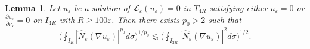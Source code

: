 \documentclass[reqno,12pt]{amsart} %
\newtheorem{lemma}[theorem]{Lemma}
\theoremstyle{definition}
\theoremstyle{remark}
\numberwithin{equation}{section}
\newcommand{\cL}{\mathcal{L}}
\newcommand{\e}{\varepsilon}
\begin{document}

\begin{lemma}\label{lem.RH}
Let $u_\e$ be a solution of $\cL_\e(u_\e) = 0$ in $T_{4R}$ satisfying either $u_\e = 0$ or $\frac{\partial u_\e}{\partial \nu_\e} = 0$ on $I_{4R}$ with $R \ge  100\e$. Then there exists $p_0 > 2$ such that
\begin{equation}\label{est.ReverseHolder.Nhat}
    \bigg( \fint_{I_R} | \widehat{N}_\e (\nabla u_\e)|^{p_0} d\sigma \bigg)^{1/{p_0}} \lesssim \bigg( \fint_{I_{2R}} |\widehat{N}_\e(\nabla u_\e)|^{2} d\sigma \bigg)^{1/{2}}.
\end{equation}
\end{lemma}
\end{document}
